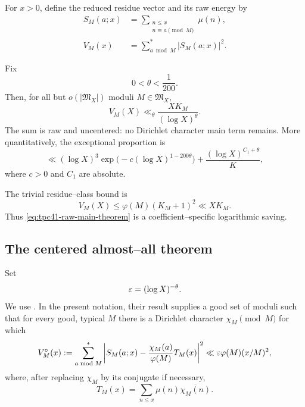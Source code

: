 For \(x>0\), define the reduced residue vector and its raw energy by
\begin{align}
 S_M(a;x)
 &=\sum_{\substack{n\le x\\n\equiv a\pmod M}}\mu(n),
 \label{eq:tpc41-SMa}\\
 V_M(x)
 &=\sum_{a\bmod M}^{*}|S_M(a;x)|^2.
 \label{eq:tpc41-VM}
\end{align}

\begin{theorem}
\label{thm:tpc41-raw-triple-prime}
Fix
\begin{equation}
 0<\theta<\frac1{200}.
 \label{eq:tpc41-theta-range}
\end{equation}
Then, for all but \(o(|\mathfrak M_X|)\) moduli
\(M\in\mathfrak M_X\),
\begin{equation}
 \boxed{
 V_M(X)
 \ll_\theta
 \frac{XK_M}{(\log X)^\theta}.}
 \label{eq:tpc41-raw-main-theorem}
\end{equation}
The sum is raw and uncentered: no Dirichlet character main term remains.
More quantitatively, the exceptional proportion is
\begin{equation}
 \ll
 (\log X)^3
 \exp\bigl(-c(\log X)^{1-200\theta}\bigr)
 +\frac{(\log X)^{C_1+\theta}}{K},
 \label{eq:tpc41-raw-exception-proportion}
\end{equation}
where \(c>0\) and \(C_1\) are absolute.
\end{theorem}

The trivial residue--class bound is
\begin{equation}
 V_M(X)
 \le\varphi(M)(K_M+1)^2
 \ll XK_M.
 \label{eq:tpc41-raw-trivial}
\end{equation}
Thus \eqref{eq:tpc41-raw-main-theorem} is a coefficient--specific
logarithmic saving.

\subsection{The centered almost--all theorem}

Set
\begin{equation}
 \varepsilon=(\log X)^{-\theta}.
 \label{eq:tpc41-epsilon}
\end{equation}
We use \citet[Theorem~1.4]{KlurmanMangerelTeravainen2023}.  In the present
notation, their result supplies a good set of moduli such that for every
good, typical \(M\) there is a Dirichlet character \(\chi_M\pmod M\) for
which
\begin{equation}
 V_M^\circ(x)
 :=\sum_{a\bmod M}^{*}
 \left|
 S_M(a;x)-\frac{\chi_M(a)}{\varphi(M)}T_M(x)
 \right|^2
 \ll\varepsilon\varphi(M)(x/M)^2,
 \label{eq:tpc41-KMT-centered}
\end{equation}
where, after replacing \(\chi_M\) by its conjugate if necessary,
\begin{equation}
 T_M(x)=\sum_{n\le x}\mu(n)\overline{\chi_M(n)}.
 \label{eq:tpc41-TM}
\end{equation}

